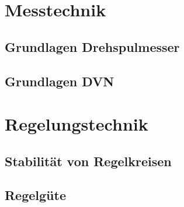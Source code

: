 \documentclass[a4paper, 11pt]{article}
\begin{document}
\section{Messtechnik}

\subsection{Grundlagen Drehspulmesser}


\subsection{Grundlagen DVN}


\section{Regelungstechnik}
\subsection{Stabilität von Regelkreisen}


\subsection{Regelgüte}

\end{document}

